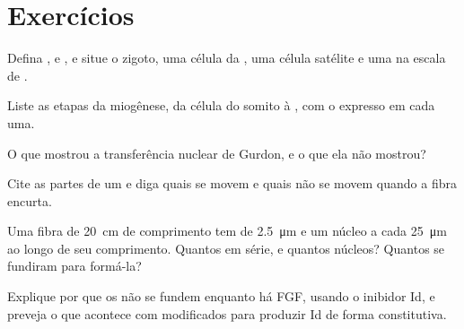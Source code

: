 \section{Exercícios}

\begin{exercise}[$\star$]\label{exo:b2:cell-differentiation:1}
Defina ,  e , e situe o zigoto, uma
célula da , uma célula satélite e uma  na escala de .
\end{exercise}

\begin{exercise}[$\star$]\label{exo:b2:cell-differentiation:2}
Liste as etapas da miogênese, da célula do somito à , com
o  expresso em cada uma.
\end{exercise}

\begin{exercise}[$\star$]\label{exo:b2:cell-differentiation:3}
O que mostrou a transferência nuclear de Gurdon, e o que ela não mostrou?
\end{exercise}

\begin{exercise}[$\star$]\label{exo:b2:cell-differentiation:4}
Cite as partes de um  e diga quais se movem e quais não se
movem quando a fibra encurta.
\end{exercise}

\begin{exercise}[$\star\star$]\label{exo:b2:cell-differentiation:5}
Uma fibra de \qty{20}{cm} de comprimento tem  de
\qty{2.5}{\micro m} e um núcleo a cada \qty{25}{\micro m} ao longo de
seu comprimento. Quantos  em série, e quantos núcleos?
Quantos  se fundiram para formá-la?
\end{exercise}

\begin{exercise}[$\star\star$]\label{exo:b2:cell-differentiation:6}
Explique por que os  não se fundem enquanto há FGF, usando o
inibidor Id, e preveja o que acontece com  modificados para
produzir Id de forma constitutiva.
\end{exercise}

